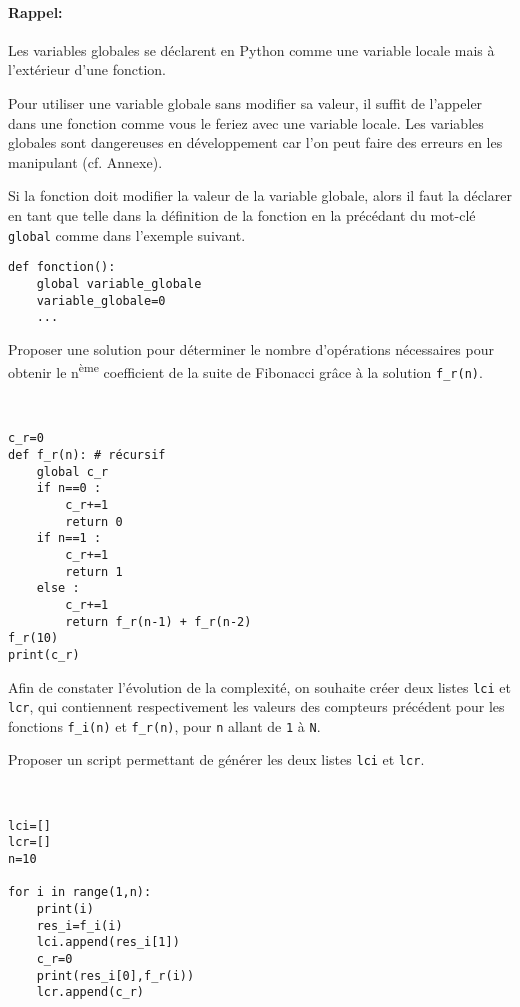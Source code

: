 \paragraph{Rappel:} Les variables globales se déclarent en Python comme une variable locale mais à l'extérieur d'une fonction.

Pour utiliser une variable globale sans modifier sa valeur, il suffit de l'appeler dans une fonction comme vous le feriez avec une variable locale. Les variables globales sont dangereuses en développement car l'on peut faire des erreurs en les manipulant (cf. Annexe).

Si la fonction doit modifier la valeur de la variable globale, alors il faut la déclarer en tant que telle dans la définition de la fonction en la précédant du mot-clé \texttt{global} comme dans l'exemple suivant.

\begin{verbatim}
def fonction():
	global variable_globale
	variable_globale=0
	...
\end{verbatim}

\begin{exercice}
Proposer une solution pour déterminer le nombre d'opérations nécessaires pour obtenir le n\textsuperscript{ème} coefficient de la suite de Fibonacci grâce à la solution \verb?f_r(n)?.
\end{exercice}

\begin{solution}~\ 
\begin{verbatim}
c_r=0
def f_r(n): # récursif
    global c_r
    if n==0 :
        c_r+=1
        return 0
    if n==1 :
        c_r+=1
        return 1
    else :
        c_r+=1
        return f_r(n-1) + f_r(n-2)
f_r(10)
print(c_r)
\end{verbatim}
\end{solution}

Afin de constater l'évolution de la complexité, on souhaite créer deux listes \verb?lci? et \verb?lcr?, qui contiennent respectivement les valeurs des compteurs précédent pour les fonctions \verb?f_i(n)? et \verb?f_r(n)?, pour \verb?n? allant de \verb?1? à \verb?N?.

\begin{exercice}
Proposer un script permettant de générer les deux listes \verb?lci? et \verb?lcr?.
\end{exercice}

\begin{solution}~\ 
\begin{verbatim}
lci=[]
lcr=[]
n=10

for i in range(1,n):
    print(i)
    res_i=f_i(i)
    lci.append(res_i[1])
    c_r=0
    print(res_i[0],f_r(i))
    lcr.append(c_r)
\end{verbatim}
\end{solution}

